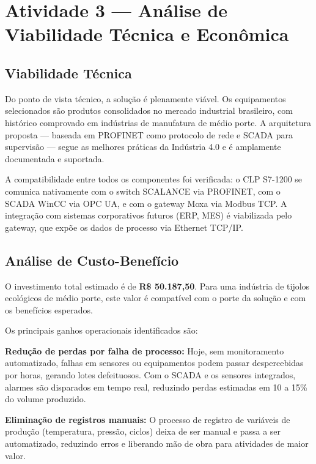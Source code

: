 \documentclass[12pt,a4paper]{article}
\begin{document}
\section{Atividade 3 --- Análise de Viabilidade Técnica e Econômica}

\subsection{Viabilidade Técnica}

Do ponto de vista técnico, a solução é plenamente viável. Os equipamentos selecionados
são produtos consolidados no mercado industrial brasileiro, com histórico comprovado
em indústrias de manufatura de médio porte. A arquitetura proposta --- baseada em
PROFINET como protocolo de rede e SCADA para supervisão --- segue as melhores práticas
da Indústria 4.0 e é amplamente documentada e suportada.

A compatibilidade entre todos os componentes foi verificada: o CLP S7-1200 se comunica
nativamente com o switch SCALANCE via PROFINET, com o SCADA WinCC via OPC UA, e com
o gateway Moxa via Modbus TCP. A integração com sistemas corporativos futuros (ERP,
MES) é viabilizada pelo gateway, que expõe os dados de processo via Ethernet TCP/IP.

\subsection{Análise de Custo-Benefício}

O investimento total estimado é de \textbf{R\$ 50.187,50}. Para uma indústria de
tijolos ecológicos de médio porte, este valor é compatível com o porte da solução
e com os benefícios esperados.

Os principais ganhos operacionais identificados são:

\textbf{Redução de perdas por falha de processo:} Hoje, sem monitoramento automatizado,
falhas em sensores ou equipamentos podem passar despercebidas por horas, gerando lotes
defeituosos. Com o SCADA e os sensores integrados, alarmes são disparados em tempo
real, reduzindo perdas estimadas em 10 a 15\% do volume produzido.

\textbf{Eliminação de registros manuais:} O processo de registro de variáveis de produção
(temperatura, pressão, ciclos) deixa de ser manual e passa a ser automatizado,
reduzindo erros e liberando mão de obra para atividades de maior valor.
\end{document}
